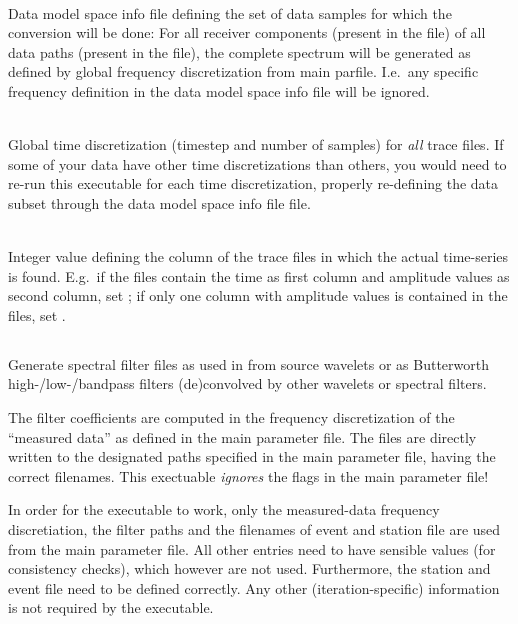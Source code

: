 \textbf{}\\
Data model space info file defining the set of data samples for which the conversion will be done:
For all receiver components (present in the file) of all data paths (present in the file), the 
complete spectrum will be generated as defined by global frequency discretization from main parfile.
I.e.\ any specific frequency definition in the data model space info file will be ignored.

\textbf{}\\
Global time discretization (timestep and number of samples) for \emph{all}  trace files.
If some of your data have other time discretizations than others, you would need to 
re-run this executable for each time discretization, properly re-defining the data subset 
through the data model space info file file.

\textbf{}\\
Integer value defining the column of the  trace files in which the actual time-series
is found. E.g.\ if the files contain the time as first column and amplitude values as second column, set
; if only one column with amplitude values is contained in the files, 
set .

%
\subsection{} \label{programs_scripts,sec:bin_prog,sec:create_spec_filters}
Generate spectral filter files as used in \ASKI{} from source wavelets or as Butterworth
high-/low-/bandpass filters (de)convolved by other wavelets or spectral filters.

The filter coefficients are computed in the frequency discretization of the ``measured data'' as defined
in the main parameter file. The files are directly written to the designated paths specified in the main parameter
file, having the correct filenames. This exectuable \emph{ignores} the flags 
in the main parameter file! 

In order for the executable to work, only the measured-data frequency discretiation, the filter paths and the filenames
of event and station file are used from the main parameter file. All other entries need to have sensible values (for consistency
checks), which however are not used.
Furthermore, the station and event file need to be defined correctly. Any other (iteration-specific) information is not
required by the executable.

